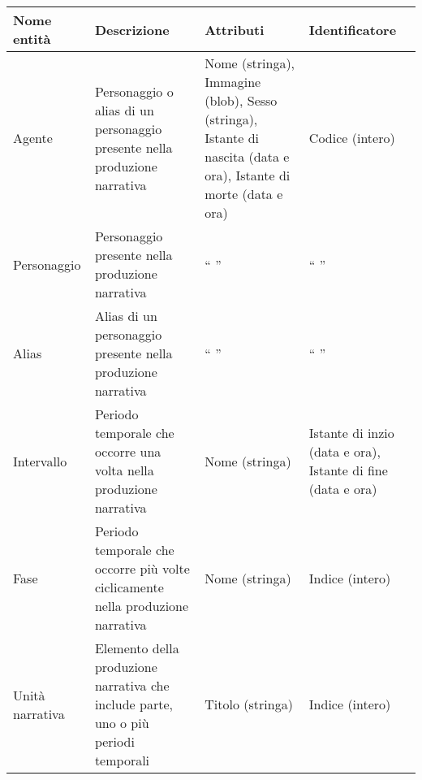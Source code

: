 \documentclass{article}
\begin{document}
\begin{center}\begin{tabular}{|p{}|p{}|p{}|p{}|}
		\hline
		\textbf{Nome entità} & \textbf{Descrizione}                                                               & \textbf{Attributi}                                                                                               & \textbf{Identificatore}                                     \\
		\hline
		Agente               & Personaggio o alias di un personaggio presente nella produzione narrativa          & Nome (stringa), Immagine (blob), Sesso (stringa), Istante di nascita (data e ora), Istante di morte (data e ora) & Codice (intero)                                             \\
		\hline
		Personaggio          & Personaggio presente nella produzione narrativa                                    & `` ''                                                                                                            & `` ''                                                       \\
		\hline
		Alias                & Alias di un personaggio presente nella produzione narrativa                        & `` ''                                                                                                            & `` ''                                                       \\
		\hline
		Intervallo           & Periodo temporale che occorre una volta nella produzione narrativa                 & Nome (stringa)                                                                                                   & Istante di inzio (data e ora), Istante di fine (data e ora) \\
		\hline
		Fase                 & Periodo temporale che occorre più volte ciclicamente nella produzione narrativa    & Nome (stringa)                                                                                                   & Indice (intero)                                             \\
		\hline
		Unità narrativa      & Elemento della produzione narrativa che include parte, uno o più periodi temporali & Titolo (stringa)                                                                                                 & Indice (intero)                                             \\

\end{tabular}
\end{center}
\end{document}
